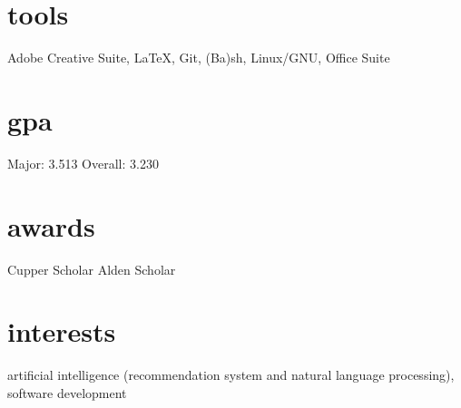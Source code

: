 \documentclass[]{friggeri-cv}
\begin{document}
\begin{aside}
  \section{tools}\vspace{0.05cm}
    Adobe Creative Suite, \LaTeX, Git, (Ba)sh, Linux/GNU, Office Suite
  \section{gpa}\vspace{0.1cm}
  	Major: 3.513
    Overall: 3.230\vspace{0.1cm}
  \section{awards}\vspace{0.05cm}
  Cupper Scholar\vspace{0.1cm}
  Alden Scholar\vspace{0.1cm}
\end{aside}

\section{interests}

artificial intelligence (recommendation system and natural language processing), software development

\end{document}
